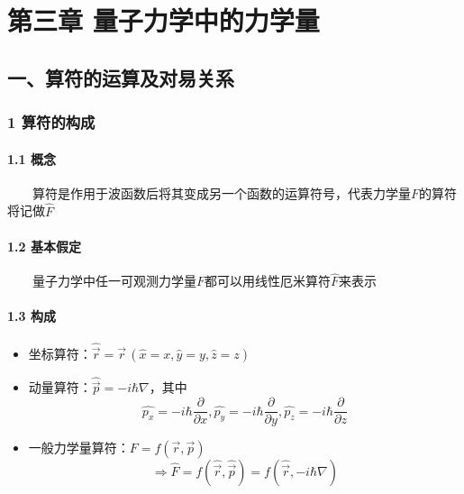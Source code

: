 \documentclass[UTF8,twocolumn]{ctexart}
\date{}
\providecommand{\tightlist}{%
  \setlength{\itemsep}{0pt}\setlength{\parskip}{0pt}}
\let\oldparagraph\paragraph
\renewcommand{\paragraph}[1]{\oldparagraph{#1}\mbox{}}
\begin{document}
\hypertarget{ux7b2cux4e09ux7ae0-ux91cfux5b50ux529bux5b66ux4e2dux7684ux529bux5b66ux91cf}{%
\section{第三章{ }量子力学中的力学量}\label{ux7b2cux4e09ux7ae0-ux91cfux5b50ux529bux5b66ux4e2dux7684ux529bux5b66ux91cf}}

\hypertarget{ux4e00ux7b97ux7b26ux7684ux8fd0ux7b97ux53caux5bf9ux6613ux5173ux7cfb}{%
\subsection{一、算符的运算及对易关系}\label{ux4e00ux7b97ux7b26ux7684ux8fd0ux7b97ux53caux5bf9ux6613ux5173ux7cfb}}

\hypertarget{ux7b97ux7b26ux7684ux6784ux6210}{%
\subsubsection{1 算符的构成}\label{ux7b97ux7b26ux7684ux6784ux6210}}

\hypertarget{ux6982ux5ff5}{%
\paragraph{ 1.1 概念}\label{ux6982ux5ff5}}

  算符是作用于波函数后将其变成另一个函数的运算符号，代表力学量\(F\)的算符将记做\(\hat{F}\)

\hypertarget{ux57faux672cux5047ux5b9a}{%
\paragraph{ 1.2 基本假定}\label{ux57faux672cux5047ux5b9a}}

  量子力学中任一可观测力学量\(F\)都可以用线性厄米算符\(\hat{F}\)来表示

\hypertarget{ux6784ux6210}{%
\paragraph{ 1.3 构成}\label{ux6784ux6210}}

\begin{itemize}
\tightlist
\item
  坐标算符：\(\hat{\vec{r}}=\vec{r}\,(\hat{x}=x,\hat{y}=y,\hat{z}=z)\)
\item
  动量算符：\(\hat{\vec{p}}=-i\hbar\nabla\)，其中
  \[\hat{p_x}=-i\hbar\frac{\partial}{\partial x},\hat{p_y}=-i\hbar\frac{\partial}{\partial y},\hat{p_z}=-i\hbar\frac{\partial}{\partial z}\]
\item
  一般力学量算符：\(F=f(\vec{r},\vec{p})\)
  \[\Rightarrow\hat{F}=f(\hat{\vec{r}},\hat{\vec{p}})=f(\hat{\vec{r}},-i\hbar\nabla)\]
\end{itemize}
\end{document}
